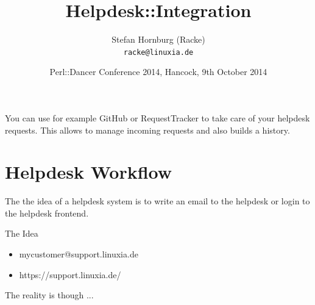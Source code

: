 \usepackage[utf8]{inputenc}
\usepackage[T1]{fontenc}
\usepackage{mathptmx}
\usepackage[scaled=.90]{helvet}
\usepackage{courier}
\usepackage{caption}
\captionsetup{labelformat=empty,labelsep=none}
\usepackage{verbatim}
\usepackage{hyperref}
\usepackage{listings}
\usepackage{ulem}
\lstset{language=Perl,basicstyle=\normalsize,tabsize=3,showstringspaces=false}

\title{Helpdesk::Integration}
\author[racke]{Stefan Hornburg (Racke)\\ \texttt{racke@linuxia.de}}
\date{Perl::Dancer Conference 2014, Hancock, 9th October 2014}


\maketitle{}

\begin{frame}
  \titlepage
\end{frame}

\tableofcontents

You can use for example GitHub or RequestTracker to take care of your
helpdesk requests. This allows to manage incoming requests and also builds
a history.

\section{Helpdesk Workflow}

The the idea of a helpdesk system is to write an email to the helpdesk
or login to the helpdesk frontend.

\begin{frame}[fragile]{The Idea}
\begin{itemize}
\item mycustomer@support.linuxia.de
\item https://support.linuxia.de/
\end{itemize}
\end{frame}

The reality is though ...


